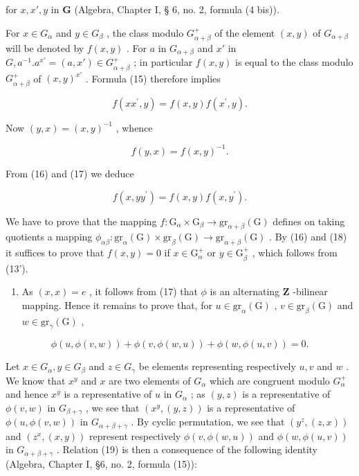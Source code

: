 for \(x, x', y\) in \(\mathbf{G}\) (Algebra, Chapter I, § 6, no. 2, formula (4 bis)).

For \(x \in G_{\alpha}\) and \(y \in G_{\beta}\) , the class modulo \(G_{\alpha + \beta}^{+}\) of the element \((x, y)\) of \(G_{\alpha + \beta}\) will be denoted by \(f(x, y)\) . For \(a\) in \(G_{\alpha + \beta}\) and \(x'\) in \(G, a^{-1}.a^{x'} = (a, x') \in G_{\alpha + \beta}^{+}\) ; in particular \(f(x, y)\) is equal to the class modulo \(G_{\alpha + \beta}^{+}\) of \((x, y)^{x'}\) . Formula (15) therefore implies

\[
f (x x ^ {\prime}, y) = f (x, y) f (x ^ {\prime}, y).\tag{16}
\]

Now \((y, x) = (x, y)^{-1}\) , whence

\[
f (y, x) = f (x, y) ^ {- 1}.\tag{17}
\]

From (16) and (17) we deduce

\[
f (x, y y ^ {\prime}) = f (x, y) f (x, y ^ {\prime}).\tag{18}
\]

We have to prove that the mapping \(f\colon \mathrm{G}_{\alpha}\times \mathrm{G}_{\beta}\to \mathrm{gr}_{\alpha +\beta}(\mathrm{G})\) defines on taking quotients a mapping \(\phi_{\alpha \beta}\colon \mathrm{gr}_{\alpha}(\mathrm{G})\times \mathrm{gr}_{\beta}(\mathrm{G})\to \mathrm{gr}_{\alpha +\beta}(\mathrm{G})\) . By (16) and (18) it suffices to prove that \(f(x,y) = 0\) if \(x\in \mathrm{G}_{\alpha}^{+}\) or \(y\in \mathrm{G}_{\beta}^{+}\) , which follows from (13').

\begin{enumerate}
\def\labelenumi{(\roman{enumi})}
\setcounter{enumi}{1}
\tightlist
\item
  As \((x, x) = e\) , it follows from (17) that \(\phi\) is an alternating \(\mathbf{Z}\) -bilinear mapping. Hence it remains to prove that, for \(u \in \mathrm{gr}_{\alpha}(\mathrm{G})\) , \(v \in \mathrm{gr}_{\beta}(\mathrm{G})\) and \(w \in \mathrm{gr}_{\gamma}(\mathrm{G})\) ,
\end{enumerate}

\[
\phi (u, \phi (v, w)) + \phi (v, \phi (w, u)) + \phi (w, \phi (u, v)) = 0.\tag{19}
\]

Let \(x \in G_{\alpha}, y \in G_{\beta}\) and \(z \in G_{\gamma}\) be elements representing respectively \(u, v\) and \(w\) . We know that \(x^{y}\) and \(x\) are two elements of \(G_{\alpha}\) which are congruent modulo \(G_{\alpha}^{+}\) and hence \(x^{y}\) is a representative of \(u\) in \(G_{\alpha}\) ; as \((y, z)\) is a representative of \(\phi(v, w)\) in \(G_{\beta + \gamma}\) , we see that \((x^{y}, (y, z))\) is a representative of \(\phi(u, \phi(v, w))\) in \(G_{\alpha + \beta + \gamma}\) . By cyclic permutation, we see that \((y^{z}, (z, x))\) and \((z^{x}, (x, y))\) represent respectively \(\phi(v, \phi(w, u))\) and \(\phi(w, \phi(u, v))\) in \(G_{\alpha + \beta + \gamma}\) . Relation (19) is then a consequence of the following identity (Algebra, Chapter I, §6, no. 2, formula (15)):


